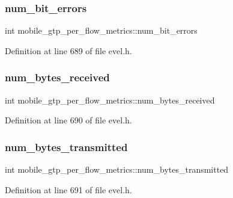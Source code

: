 \subsubsection{\texorpdfstring{num\+\_\+bit\+\_\+errors}{num\_bit\_errors}}
{\footnotesize\ttfamily int mobile\+\_\+gtp\+\_\+per\+\_\+flow\+\_\+metrics\+::num\+\_\+bit\+\_\+errors}



Definition at line 689 of file evel.\+h.

\hypertarget{structmobile__gtp__per__flow__metrics_a91030f1538091586266af95949b0f38d}{}\label{structmobile__gtp__per__flow__metrics_a91030f1538091586266af95949b0f38d} 
\subsubsection{\texorpdfstring{num\+\_\+bytes\+\_\+received}{num\_bytes\_received}}
{\footnotesize\ttfamily int mobile\+\_\+gtp\+\_\+per\+\_\+flow\+\_\+metrics\+::num\+\_\+bytes\+\_\+received}



Definition at line 690 of file evel.\+h.

\hypertarget{structmobile__gtp__per__flow__metrics_af83236faaa6dcc15f228a450552c783a}{}\label{structmobile__gtp__per__flow__metrics_af83236faaa6dcc15f228a450552c783a} 
\subsubsection{\texorpdfstring{num\+\_\+bytes\+\_\+transmitted}{num\_bytes\_transmitted}}
{\footnotesize\ttfamily int mobile\+\_\+gtp\+\_\+per\+\_\+flow\+\_\+metrics\+::num\+\_\+bytes\+\_\+transmitted}



Definition at line 691 of file evel.\+h.

\hypertarget{structmobile__gtp__per__flow__metrics_ac0a5f2f84f0d6276934ef0e74d839d2b}{}\label{structmobile__gtp__per__flow__metrics_ac0a5f2f84f0d6276934ef0e74d839d2b} 
